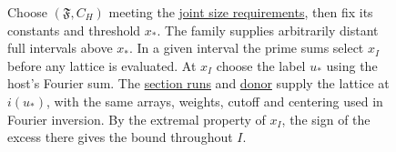 \begin{figure}[!htbp]
{  Choose \((\mathfrak F,C_H)\) meeting the
  \hyperlink{proof.join-size-requirements}{joint size requirements},
  then fix its constants and threshold \(x_*\).
  The family supplies arbitrarily distant full intervals above \(x_*\).
  In a given interval the prime sums select \(x_I\) before any
  lattice is evaluated. At \(x_I\) choose the label \(u_*\) using the
  host's Fourier sum. The
  \hyperlink{proof.section-run-family-identification}{section runs}
  and \hyperlink{proof.ramified-donor-identification}{donor} supply
  the lattice at \(i(u_*)\), with the same arrays, weights, cutoff
  and centering used in Fourier inversion. By the extremal property of
  \(x_I\), the sign of the excess there gives the bound throughout \(I\).}
\label{fig:family-window}
\end{figure}
